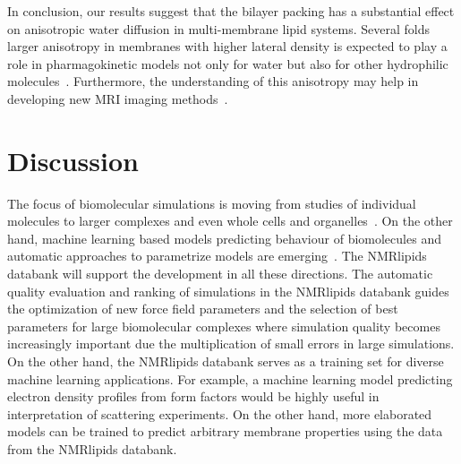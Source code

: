 \documentclass[fleqn,10pt]{wlscirep}
\begin{document}
In conclusion, our results suggest that the bilayer packing has a substantial effect on anisotropic water diffusion in multi-membrane lipid systems. Several folds larger anisotropy in membranes with higher lateral density is expected to play a role in pharmagokinetic models not only for water but also for other hydrophilic molecules~\cite{nitsche19}. Furthermore, the understanding of this anisotropy may help in developing new MRI imaging methods~\cite{topgaard20}.

\section{Discussion}


The focus of biomolecular simulations is moving from studies of individual molecules to larger complexes and even whole cells and organelles~\cite{johnson15,thornburg22,gupta22}. On the other hand, machine learning based models predicting behaviour of biomolecules and automatic approaches to parametrize models are emerging~\cite{jumper21,antila22b}. The NMRlipids databank will support the development in all these directions. The automatic quality evaluation and ranking of simulations in the NMRlipids databank guides the optimization of new force field parameters and the selection of best parameters for large biomolecular complexes where simulation quality becomes increasingly important due the multiplication of small errors in large simulations. On the other hand, the NMRlipids databank serves as a training set for diverse machine learning applications. 
For example, a machine learning model predicting electron density profiles from form factors would be highly useful in interpretation of scattering experiments. On the other hand, more elaborated models can be trained to predict arbitrary membrane properties using the data from the NMRlipids databank. 
\end{document}
